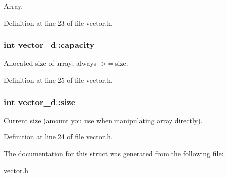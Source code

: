 \-Array. 



\-Definition at line 23 of file vector.\-h.

\hypertarget{structvector__d_acc924985e421a81b7acb5a2ee8eecfaa}{
\subsubsection[{capacity}]{\setlength{\rightskip}{0pt plus 5cm}int {\bf vector\-\_\-d\-::capacity}}}\label{structvector__d_acc924985e421a81b7acb5a2ee8eecfaa}


\-Allocated size of array; always $>$= size. 



\-Definition at line 25 of file vector.\-h.

\hypertarget{structvector__d_a0267fa83b14889786ec36cdbe78a71b3}{
\subsubsection[{size}]{\setlength{\rightskip}{0pt plus 5cm}int {\bf vector\-\_\-d\-::size}}}\label{structvector__d_a0267fa83b14889786ec36cdbe78a71b3}


\-Current size (amount you use when manipulating array directly). 



\-Definition at line 24 of file vector.\-h.



\-The documentation for this struct was generated from the following file\-:\begin{DoxyCompactItemize}
\item 
\hyperlink{vector_8h}{vector.\-h}\end{DoxyCompactItemize}
